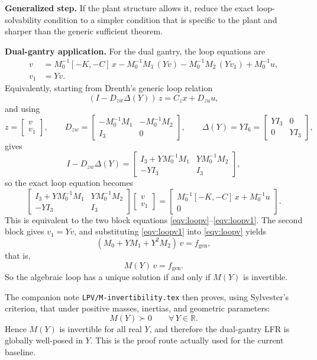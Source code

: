 ﻿\documentclass[11pt]{article}
\newcommand{\R}{\mathbb{R}}
\newcommand{\audititem}[2]{\par\smallskip\noindent\textbf{#1.} #2\par}
\begin{document}
\audititem{Generalized step}{If the plant structure allows it, reduce the exact
loop-solvability condition to a simpler condition that is specific to the plant
and sharper than the generic sufficient theorem.}

\audititem{Dual-gantry application}{For the dual gantry, the loop equations are
\begin{align}
    v   &= M_0^{-1}[-K,-C]\,x - M_0^{-1}M_1\,(Yv)
           - M_0^{-1}M_2\,(Yv_1) + M_0^{-1}u,
           \label{eqv:loopv} \\
    v_1 &= Yv. \label{eqv:loopv1}
\end{align}
Equivalently, starting from Drenth's generic loop relation
\[
    (I-D_{zw}\Delta(Y))\,z = C_z x + D_{zu}u,
\]
and using
\[
    z=\begin{bmatrix}v\\v_1\end{bmatrix},\qquad
    D_{zw}=
    \begin{bmatrix}
        -M_0^{-1}M_1 & -M_0^{-1}M_2 \\
        I_3 & 0
    \end{bmatrix},
    \qquad
    \Delta(Y)=YI_6=
    \begin{bmatrix}
        YI_3 & 0 \\
        0 & YI_3
    \end{bmatrix},
\]
gives
\[
    I-D_{zw}\Delta(Y)=
    \begin{bmatrix}
        I_3 + YM_0^{-1}M_1 & YM_0^{-1}M_2 \\
        -YI_3 & I_3
    \end{bmatrix},
\]
so the exact loop equation becomes
\[
    \begin{bmatrix}
        I_3 + YM_0^{-1}M_1 & YM_0^{-1}M_2 \\
        -YI_3 & I_3
    \end{bmatrix}
    \begin{bmatrix}
        v \\
        v_1
    \end{bmatrix}
    =
    \begin{bmatrix}
        M_0^{-1}[-K,-C]\,x + M_0^{-1}u \\
        0
    \end{bmatrix}.
\]
This is equivalent to the two block equations \eqref{eqv:loopv}--\eqref{eqv:loopv1}. The
second block gives \(v_1=Yv\), and substituting \eqref{eqv:loopv1} into
\eqref{eqv:loopv} yields
\[
(M_0 + YM_1 + Y^2 M_2)\,v = f_{\mathrm{gen}},
\]
that is,
\begin{equation}
    M(Y)\,v = f_{\mathrm{gen}}.
    \label{eqv:loopreduced}
\end{equation}
So the algebraic loop has a unique solution if and only if $M(Y)$ is
invertible.

The companion note \texttt{LPV/M-invertibility.tex} then proves, using
Sylvester's criterion, that under positive masses, inertias, and geometric
parameters:
\[
M(Y) \succ 0 \qquad \forall\, Y \in \R.
\]
Hence $M(Y)$ is invertible for all real $Y$, and therefore the dual-gantry LFR
is globally well-posed in $Y$. This is the proof route actually used for the
current baseline.}
\end{document}
